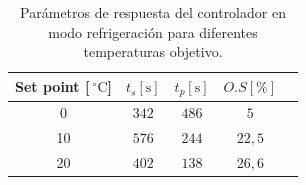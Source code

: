 \begin{table}[h!]
\caption{Parámetros de respuesta del controlador en modo refrigeración para diferentes temperaturas objetivo.}
    \label{table_PID_e}
	\centering
	\begin{tabular}{ c  c  c  c c}
    \hline
    Set point [$~^\circ \mbox{C}$]       & $t_s [\mbox{s}]$    & $t_p[\mbox{s}]$    &  $O.S[\%]$    \\ \hline
    \multicolumn{1}{c}{0}     & $342$        & $486$        & $5$    \\
    \multicolumn{1}{c}{10}      & $576$        & $244$        & $22,5$   \\
    \multicolumn{1}{c}{20}      & $402$        & $138$        & $26,6$   \\ \hline
	\end{tabular}	
\end{table}
